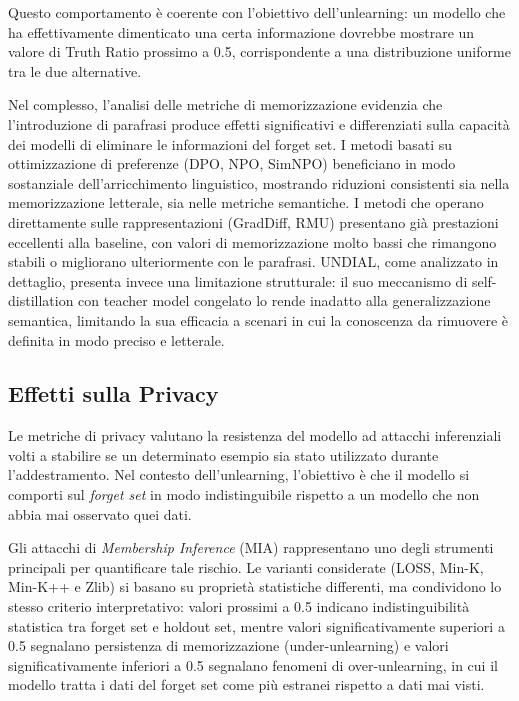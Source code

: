 Questo comportamento è coerente con l'obiettivo dell'unlearning: un modello che ha effettivamente dimenticato una certa informazione dovrebbe mostrare un valore di Truth Ratio prossimo a 0.5, corrispondente a una distribuzione uniforme tra le due alternative.

Nel complesso, l'analisi delle metriche di memorizzazione evidenzia che l'introduzione di parafrasi produce effetti significativi e differenziati sulla capacità dei modelli di eliminare le informazioni del forget set. I metodi basati su ottimizzazione di preferenze (DPO, NPO, SimNPO) beneficiano in modo sostanziale dell'arricchimento linguistico, mostrando riduzioni consistenti sia nella memorizzazione letterale, sia nelle metriche semantiche. I metodi che operano direttamente sulle rappresentazioni (GradDiff, RMU) presentano già prestazioni eccellenti alla baseline, con valori di memorizzazione molto bassi che rimangono stabili o migliorano ulteriormente con le parafrasi. UNDIAL, come analizzato in dettaglio, presenta invece una limitazione strutturale: il suo meccanismo di self-distillation con teacher model congelato lo rende inadatto alla generalizzazione semantica, limitando la sua efficacia a scenari in cui la conoscenza da rimuovere è definita in modo preciso e letterale.


\subsection{Effetti sulla Privacy}

Le metriche di privacy valutano la resistenza del modello ad attacchi inferenziali volti a stabilire se un determinato esempio sia stato utilizzato durante l’addestramento. Nel contesto dell’unlearning, l’obiettivo è che il modello si comporti sul \emph{forget set} in modo indistinguibile rispetto a un modello che non abbia mai osservato quei dati.

Gli attacchi di \textit{Membership Inference} (MIA) rappresentano uno degli strumenti principali per quantificare tale rischio. Le varianti considerate (LOSS, Min-K, Min-K++ e Zlib) si basano su proprietà statistiche differenti, ma condividono lo stesso criterio interpretativo: valori prossimi a 0.5 indicano indistinguibilità statistica tra forget set e holdout set, mentre valori significativamente superiori a 0.5 segnalano persistenza di memorizzazione (under-unlearning) e valori significativamente inferiori a 0.5 segnalano fenomeni di over-unlearning, in cui il modello tratta i dati del forget set come più estranei rispetto a dati mai visti.

